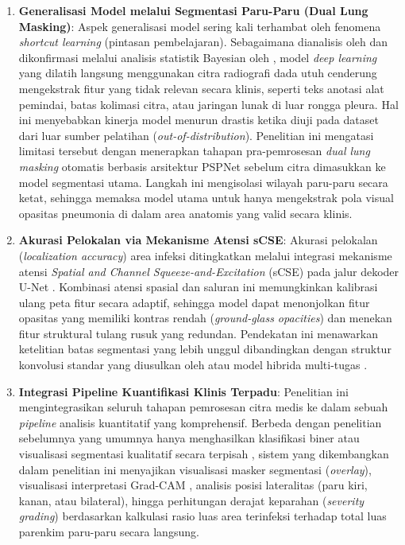 \documentclass[12pt,a4paper,oneside]{book}
\begin{document}
\begin{enumerate}
  \item \textbf{Generalisasi Model melalui Segmentasi Paru-Paru (Dual Lung Masking)}: 
  Aspek generalisasi model sering kali terhambat oleh fenomena \textit{shortcut learning} (pintasan pembelajaran). Sebagaimana dianalisis oleh \textcite{teixeira2020} dan dikonfirmasi melalui analisis statistik Bayesian oleh \textcite{bassi2022}, model \textit{deep learning} yang dilatih langsung menggunakan citra radiografi dada utuh cenderung mengekstrak fitur yang tidak relevan secara klinis, seperti teks anotasi alat pemindai, batas kolimasi citra, atau jaringan lunak di luar rongga pleura. Hal ini menyebabkan kinerja model menurun drastis ketika diuji pada dataset dari luar sumber pelatihan (\textit{out-of-distribution}). Penelitian ini mengatasi limitasi tersebut dengan menerapkan tahapan pra-pemrosesan \textit{dual lung masking} otomatis berbasis arsitektur PSPNet sebelum citra dimasukkan ke model segmentasi utama. Langkah ini mengisolasi wilayah paru-paru secara ketat, sehingga memaksa model utama untuk hanya mengekstrak pola visual opasitas pneumonia di dalam area anatomis yang valid secara klinis.

  \item \textbf{Akurasi Pelokalan via Mekanisme Atensi sCSE}: 
  Akurasi pelokalan (\textit{localization accuracy}) area infeksi ditingkatkan melalui integrasi mekanisme atensi \textit{Spatial and Channel Squeeze-and-Excitation} (sCSE) pada jalur dekoder U-Net \parencite{roy2018scse}. Kombinasi atensi spasial dan saluran ini memungkinkan kalibrasi ulang peta fitur secara adaptif, sehingga model dapat menonjolkan fitur opasitas yang memiliki kontras rendah (\textit{ground-glass opacities}) dan menekan fitur struktural tulang rusuk yang redundan. Pendekatan ini menawarkan ketelitian batas segmentasi yang lebih unggul dibandingkan dengan struktur konvolusi standar yang diusulkan oleh \textcite{degerli2022} atau model hibrida multi-tugas \parencite{farag2020}.

  \item \textbf{Integrasi Pipeline Kuantifikasi Klinis Terpadu}: 
  Penelitian ini mengintegrasikan seluruh tahapan pemrosesan citra medis ke dalam sebuah \textit{pipeline} analisis kuantitatif yang komprehensif. Berbeda dengan penelitian sebelumnya yang umumnya hanya menghasilkan klasifikasi biner atau visualisasi segmentasi kualitatif secara terpisah \parencite{seth2022, mallidi2024}, sistem yang dikembangkan dalam penelitian ini menyajikan visualisasi masker segmentasi (\textit{overlay}), visualisasi interpretasi Grad-CAM \parencite{selvaraju2017gradcam}, analisis posisi lateralitas (paru kiri, kanan, atau bilateral), hingga perhitungan derajat keparahan (\textit{severity grading}) berdasarkan kalkulasi rasio luas area terinfeksi terhadap total luas parenkim paru-paru secara langsung.


\end{enumerate}
\end{document}
